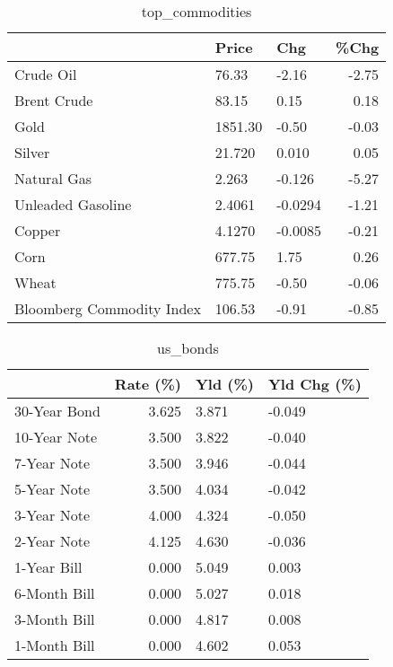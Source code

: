 \documentclass{article}%
\begin{document}
\begin{table}[htbp]%
\caption{top\_commodities}%
\centering%
\begin{adjustbox}{width=1\textwidth}%
\begin{tabular}{lllr}
\toprule
                          &   Price &     Chg &  \%Chg \\
\midrule
               Crude Oil  &   76.33 &   -2.16 & -2.75 \\
             Brent Crude  &   83.15 &    0.15 &  0.18 \\
                    Gold  & 1851.30 &   -0.50 & -0.03 \\
                  Silver  &  21.720 &   0.010 &  0.05 \\
             Natural Gas  &   2.263 &  -0.126 & -5.27 \\
       Unleaded Gasoline  &  2.4061 & -0.0294 & -1.21 \\
                  Copper  &  4.1270 & -0.0085 & -0.21 \\
                    Corn  &  677.75 &    1.75 &  0.26 \\
                   Wheat  &  775.75 &   -0.50 & -0.06 \\
Bloomberg Commodity Index &  106.53 &   -0.91 & -0.85 \\
\bottomrule
\end{tabular}
%
\end{adjustbox}%
\end{table}

%


\begin{table}[htbp]%
\caption{us\_bonds}%
\centering%
\begin{adjustbox}{width=1\textwidth}%
\begin{tabular}{lrll}
\toprule
             &  Rate (\%) & Yld (\%) & Yld Chg (\%) \\
\midrule
30-Year Bond &     3.625 &   3.871 &      -0.049 \\
10-Year Note &     3.500 &   3.822 &      -0.040 \\
 7-Year Note &     3.500 &   3.946 &      -0.044 \\
 5-Year Note &     3.500 &   4.034 &      -0.042 \\
 3-Year Note &     4.000 &   4.324 &      -0.050 \\
 2-Year Note &     4.125 &   4.630 &      -0.036 \\
 1-Year Bill &     0.000 &   5.049 &       0.003 \\
6-Month Bill &     0.000 &   5.027 &       0.018 \\
3-Month Bill &     0.000 &   4.817 &       0.008 \\
1-Month Bill &     0.000 &   4.602 &       0.053 \\
\bottomrule
\end{tabular}
%
\end{adjustbox}%
\end{table}
\end{document}
